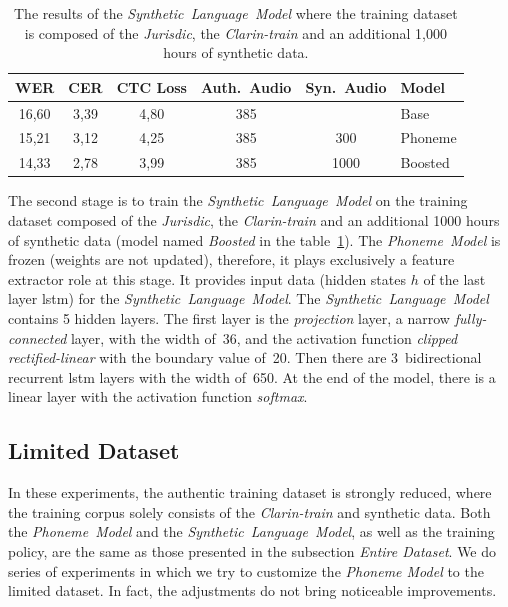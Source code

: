\begin{table}[h!]
\vspace*{10pt}
\centering
 \begin{tabular}{c c c c c l}
  \toprule
    WER	    & CER	 & CTC Loss	 & Auth.~Audio	&  Syn.~Audio	& Model         \\
    \midrule
    16,60	& 3,39	& 4,80	    & 385		    &               & Base          \\
    15,21	& 3,12	& 4,25	    & 385	        & 300	        & Phoneme       \\
    14,33	& 2,78	& 3,99	    & 385	        & 1000	        & Boosted       \\
  \bottomrule
 \end{tabular}
\caption{
The results of the \textit{Synthetic~Language~Model} where the training dataset is composed of
the \textit{Jurisdic}, the \textit{Clarin-train} and an additional 1,000 hours of synthetic data.
}
\label{table:entire-dataset}
\end{table}

The second stage is to train the \textit{Synthetic~Language~Model} on the training dataset composed of
the \textit{Jurisdic}, the \textit{Clarin-train} and an additional 1000 hours of synthetic data
(model named \textit{Boosted} in the table~\ref{table:entire-dataset}).
The \textit{Phoneme~Model} is frozen (weights are not updated), therefore, it plays exclusively
a feature extractor role at this stage.
It provides input data (hidden states $h$ of the last layer \acrshort{lstm}) for the \textit{Synthetic~Language~Model}.
The \textit{Synthetic~Language~Model} contains 5 hidden layers.
The first layer is the \textit{projection} layer, a narrow \textit{fully-connected} layer,
with the width of~36, and the activation function \textit{clipped rectified-linear} with the boundary value of~20.
Then there are 3~bidirectional recurrent \acrshort{lstm} layers with the width of~650.
At the end of the model, there is a linear layer with the activation function \textit{softmax}.

\subsection*{Limited Dataset}

In these experiments, the authentic training dataset is strongly reduced, where
the training corpus solely consists of the \textit{Clarin-train} and synthetic data.
Both the \textit{Phoneme~Model} and the \textit{Synthetic~Language~Model}, as well as the training policy,
are the same as those presented in the subsection \textit{Entire Dataset}.
We do series of experiments in which we try to customize the \textit{Phoneme Model}
to the limited dataset.
In fact, the adjustments do not bring noticeable improvements.


